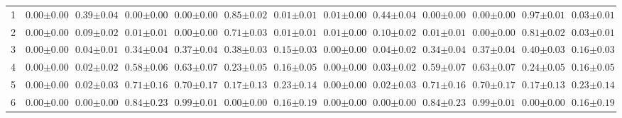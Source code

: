 \begin{table}[!t]
\begin{tabular}{l cccccc cccccc}
1 & $0.00 {\scriptstyle \pm 0.00}$ & $0.39 {\scriptstyle \pm 0.04}$ & $0.00 {\scriptstyle \pm 0.00}$ & $0.00 {\scriptstyle \pm 0.00}$ & $0.85 {\scriptstyle \pm 0.02}$ & $0.01 {\scriptstyle \pm 0.01}$ & $0.01 {\scriptstyle \pm 0.00}$ & $0.44 {\scriptstyle \pm 0.04}$ & $0.00 {\scriptstyle \pm 0.00}$ & $0.00 {\scriptstyle \pm 0.00}$ & $0.97 {\scriptstyle \pm 0.01}$ & $0.03 {\scriptstyle \pm 0.01}$ \\
2 & $0.00 {\scriptstyle \pm 0.00}$ & $0.09 {\scriptstyle \pm 0.02}$ & $0.01 {\scriptstyle \pm 0.01}$ & $0.00 {\scriptstyle \pm 0.00}$ & $0.71 {\scriptstyle \pm 0.03}$ & $0.01 {\scriptstyle \pm 0.01}$ & $0.01 {\scriptstyle \pm 0.00}$ & $0.10 {\scriptstyle \pm 0.02}$ & $0.01 {\scriptstyle \pm 0.01}$ & $0.00 {\scriptstyle \pm 0.00}$ & $0.81 {\scriptstyle \pm 0.02}$ & $0.03 {\scriptstyle \pm 0.01}$ \\
3 & $0.00 {\scriptstyle \pm 0.00}$ & $0.04 {\scriptstyle \pm 0.01}$ & $0.34 {\scriptstyle \pm 0.04}$ & $0.37 {\scriptstyle \pm 0.04}$ & $0.38 {\scriptstyle \pm 0.03}$ & $0.15 {\scriptstyle \pm 0.03}$ & $0.00 {\scriptstyle \pm 0.00}$ & $0.04 {\scriptstyle \pm 0.02}$ & $0.34 {\scriptstyle \pm 0.04}$ & $0.37 {\scriptstyle \pm 0.04}$ & $0.40 {\scriptstyle \pm 0.03}$ & $0.16 {\scriptstyle \pm 0.03}$ \\
4 & $0.00 {\scriptstyle \pm 0.00}$ & $0.02 {\scriptstyle \pm 0.02}$ & $0.58 {\scriptstyle \pm 0.06}$ & $0.63 {\scriptstyle \pm 0.07}$ & $0.23 {\scriptstyle \pm 0.05}$ & $0.16 {\scriptstyle \pm 0.05}$ & $0.00 {\scriptstyle \pm 0.00}$ & $0.03 {\scriptstyle \pm 0.02}$ & $0.59 {\scriptstyle \pm 0.07}$ & $0.63 {\scriptstyle \pm 0.07}$ & $0.24 {\scriptstyle \pm 0.05}$ & $0.16 {\scriptstyle \pm 0.05}$ \\
5 & $0.00 {\scriptstyle \pm 0.00}$ & $0.02 {\scriptstyle \pm 0.03}$ & $0.71 {\scriptstyle \pm 0.16}$ & $0.70 {\scriptstyle \pm 0.17}$ & $0.17 {\scriptstyle \pm 0.13}$ & $0.23 {\scriptstyle \pm 0.14}$ & $0.00 {\scriptstyle \pm 0.00}$ & $0.02 {\scriptstyle \pm 0.03}$ & $0.71 {\scriptstyle \pm 0.16}$ & $0.70 {\scriptstyle \pm 0.17}$ & $0.17 {\scriptstyle \pm 0.13}$ & $0.23 {\scriptstyle \pm 0.14}$ \\
6 & $0.00 {\scriptstyle \pm 0.00}$ & $0.00 {\scriptstyle \pm 0.00}$ & $0.84 {\scriptstyle \pm 0.23}$ & $0.99 {\scriptstyle \pm 0.01}$ & $0.00 {\scriptstyle \pm 0.00}$ & $0.16 {\scriptstyle \pm 0.19}$ & $0.00 {\scriptstyle \pm 0.00}$ & $0.00 {\scriptstyle \pm 0.00}$ & $0.84 {\scriptstyle \pm 0.23}$ & $0.99 {\scriptstyle \pm 0.01}$ & $0.00 {\scriptstyle \pm 0.00}$ & $0.16 {\scriptstyle \pm 0.19}$ \\
\bottomrule
\end{tabular}
\label{tab:appendix_bfs_probing}
\end{table}
